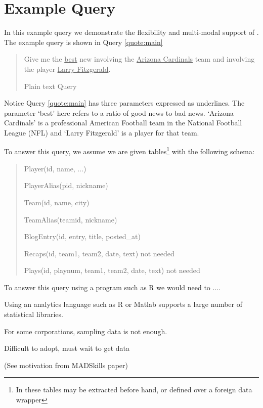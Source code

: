 
\section{Example Query}

In this example query we demonstrate the flexibility and multi-modal 
support of \system. The example query is shown in Query \ref{quote:main}


\begin{quotation}

Give me the \underline{best} new involving the \underline{Arizona Cardinals} 
team and involving the player \underline{Larry Fitzgerald}.

\caption{Plain text Query}
\label{quote:main}
\end{quotation}


Notice Query \ref{quote:main} has three parameters expressed as underlines.
The parameter `best' here refers to a ratio of good news to bad news.
`Arizona Cardinals' is a professional American Football team in the National
Football League (NFL) and `Larry Fitzgerald' is a player for that team.

To answer this query, we assume we are given tables\footnote{In \system these
tables may be extracted before hand, or defined over a foreign data wrapper}
with the following schema:

\begin{quotation}
Player(id, name, ...)

PlayerAlias(pid, nickname)

Team(id, name, city)

TeamAlias(teamid, nickname)

BlogEntry(id, entry, title, posted\_at)

Recaps(id, team1, team2, date, text) \leftarrow not needed

Plays(id, playnum, team1, team2, date, text) \leftarrow not needed
\end{quotation}


To answer this query using a program such as R we would need to ....

Using an analytics language such as R or Matlab supports a large number of 
statistical libraries.

For some corporations, sampling data is not enough.

Difficult to adopt, must wait to get data 

(See motivation from MADSkills paper)
